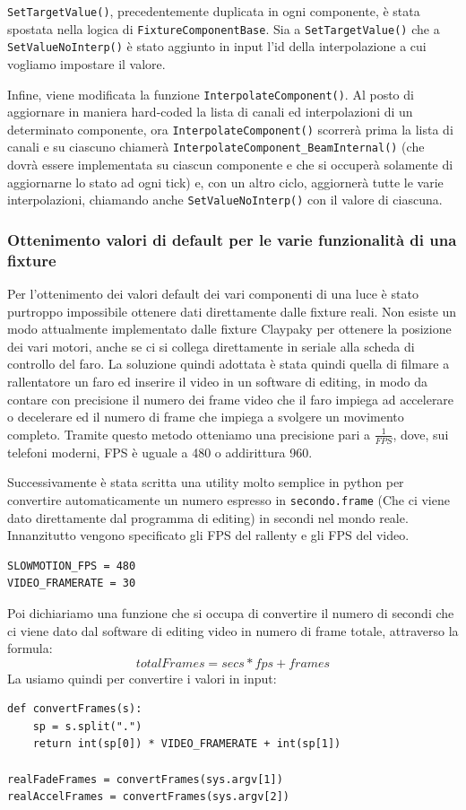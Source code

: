 \documentclass[main.tex]{subfiles}
\begin{document}
\lstinline{SetTargetValue()}, precedentemente duplicata in ogni componente, è stata spostata nella logica di \lstinline{FixtureComponentBase}. Sia a \lstinline{SetTargetValue()} che a \lstinline{SetValueNoInterp()} è stato aggiunto in input l'id della interpolazione a cui vogliamo impostare il valore. 

Infine, viene modificata la funzione \lstinline{InterpolateComponent()}. Al posto di aggiornare in maniera hard-coded la lista di canali ed interpolazioni di un determinato componente, ora \lstinline{InterpolateComponent()} scorrerà prima la lista di canali e su ciascuno chiamerà \lstinline{InterpolateComponent_BeamInternal()} (che dovrà essere implementata su ciascun componente e che si occuperà solamente di aggiornarne lo stato ad ogni tick) e, con un altro ciclo, aggiornerà tutte le varie interpolazioni, chiamando anche \lstinline{SetValueNoInterp()} con il valore di ciascuna.

\subsubsection{Ottenimento valori di default per le varie funzionalità di una fixture}\label{subsec:3_1_defaultValues}
Per l'ottenimento dei valori default dei vari componenti di una luce è stato purtroppo impossibile ottenere dati direttamente dalle fixture reali. Non esiste un modo attualmente implementato dalle fixture Claypaky per ottenere la posizione dei vari motori, anche se ci si collega direttamente in seriale alla scheda di controllo del faro. La soluzione quindi adottata è stata quindi quella di filmare a rallentatore un faro ed inserire il video in un software di editing, in modo da contare con precisione il numero dei frame video che il faro impiega ad accelerare o decelerare ed il numero di frame che impiega a svolgere un movimento completo. Tramite questo metodo otteniamo una precisione pari a $\frac{1}{FPS}$, dove, sui telefoni moderni, FPS è uguale a 480 o addirittura 960.\newline

Successivamente è stata scritta una utility molto semplice in python per convertire automaticamente un numero espresso in \lstinline{secondo.frame} (Che ci viene dato direttamente dal programma di editing) in secondi nel mondo reale.
Innanzitutto vengono specificato gli FPS del rallenty e gli FPS del video.
\lstset{language=python}
\begin{lstlisting}
SLOWMOTION_FPS = 480
VIDEO_FRAMERATE = 30
\end{lstlisting}
Poi dichiariamo una funzione che si occupa di convertire il numero di secondi che ci viene dato dal software di editing video in numero di frame totale, attraverso la formula:
\[totalFrames = secs * fps + frames\]
La usiamo quindi per convertire i valori in input:
\begin{lstlisting}
def convertFrames(s):
    sp = s.split(".")
    return int(sp[0]) * VIDEO_FRAMERATE + int(sp[1])

realFadeFrames = convertFrames(sys.argv[1])
realAccelFrames = convertFrames(sys.argv[2])
\end{lstlisting}
\end{document}
